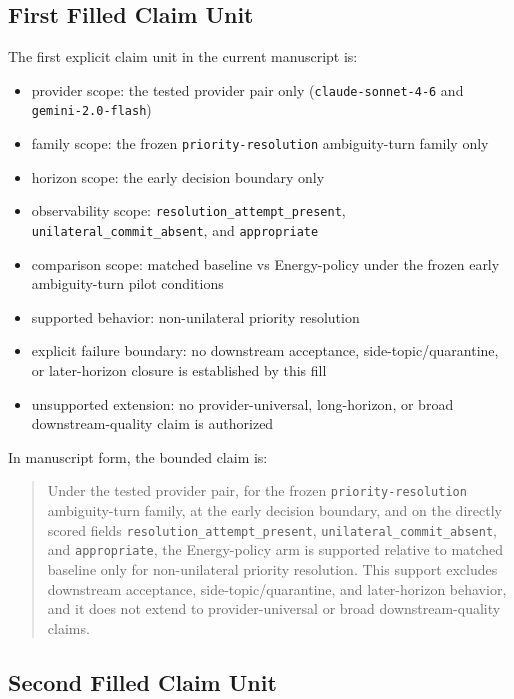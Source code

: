 \documentclass[11pt]{article}
\begin{document}
\subsection{First Filled Claim Unit}

The first explicit claim unit in the current manuscript is:

\begin{itemize}
\item provider scope:
  the tested provider pair only (\texttt{claude-sonnet-4-6} and
  \texttt{gemini-2.0-flash})
\item family scope:
  the frozen \texttt{priority-resolution} ambiguity-turn family only
\item horizon scope:
  the early decision boundary only
\item observability scope:
  \texttt{resolution\_attempt\_present},
  \texttt{unilateral\_commit\_absent}, and \texttt{appropriate}
\item comparison scope:
  matched baseline vs Energy-policy under the frozen early
  ambiguity-turn pilot conditions
\item supported behavior:
  non-unilateral priority resolution
\item explicit failure boundary:
  no downstream acceptance, side-topic/quarantine, or later-horizon closure is
  established by this fill
\item unsupported extension:
  no provider-universal, long-horizon, or broad downstream-quality claim is
  authorized
\end{itemize}

In manuscript form, the bounded claim is:

\begin{quote}
Under the tested provider pair, for the frozen \texttt{priority-resolution}
ambiguity-turn family, at the early decision boundary, and on the directly scored
fields \texttt{resolution\_attempt\_present},
\texttt{unilateral\_commit\_absent}, and \texttt{appropriate}, the Energy-policy
arm is supported relative to matched baseline only for non-unilateral priority
resolution. This support excludes downstream acceptance, side-topic/quarantine,
and later-horizon behavior, and it does not extend to provider-universal or broad
downstream-quality claims.
\end{quote}

\subsection{Second Filled Claim Unit}
\end{document}
